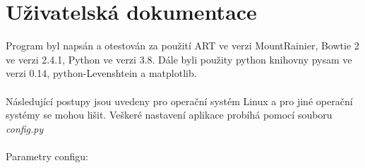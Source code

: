 \documentclass[czech,DP]{thesiskiv}
\numberwithin{equation}{section}
\begin{document}
% 
%
\nocite{*}

{\raggedright\small

}


\appendix
\chapter{Uživatelská dokumentace}
Program byl napsán a otestován za použití ART ve verzi MountRainier, Bowtie 2 ve verzi 2.4.1, Python ve verzi 3.8. Dále byli použity python knihovny pysam ve verzi 0.14, python-Levenshtein a matplotlib.
\\
\\
Následující postupy jsou uvedeny pro operační systém Linux a pro jiné operační systémy se mohou lišit. Veškeré nastavení aplikace probíhá pomocí souboru \textit{config.py}
\\
\\
\noindent
Parametry configu:
\end{document}
